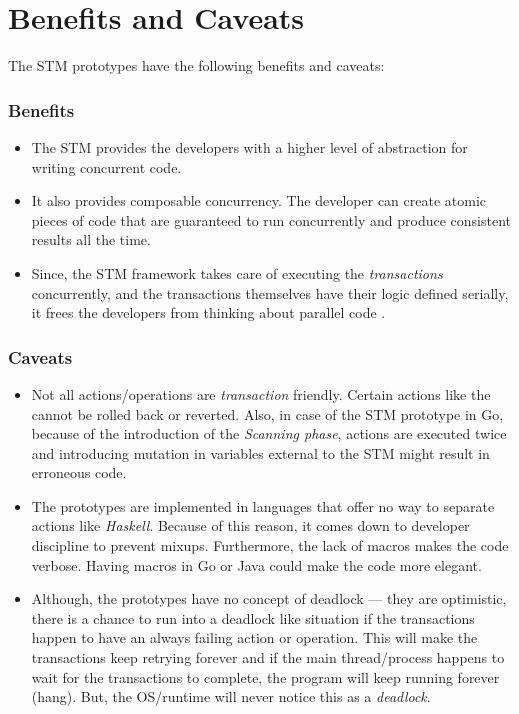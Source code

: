 \documentclass[../main]{subfiles}
\begin{document}
  \section{Benefits and Caveats}

  \par
  The STM prototypes have the following benefits and caveats:

  \subsubsection{Benefits}
  \begin{itemize}
    
    \item The STM provides the developers with a higher level of abstraction for writing concurrent code.

    \item It also provides composable concurrency. The developer can create atomic pieces of code that are guaranteed to run concurrently and produce consistent results all the time.

    \item Since, the STM framework takes care of executing the {\em transactions} concurrently, and the transactions themselves have their logic defined serially, it frees the developers from thinking about parallel code \cite{weimerskirch2008software}.

  \end{itemize}

  \subsubsection{Caveats}
  \begin{itemize}

    \item Not all actions/operations are {\em transaction} friendly. Certain actions like the  cannot be rolled back or reverted. Also, in case of the STM prototype in Go, because of the introduction of the {\em Scanning phase}, actions are executed twice and introducing mutation in variables external to the STM might result in erroneous code.

    \item The prototypes are implemented in languages that offer no way to separate  actions like {\em Haskell}. Because of this reason, it comes down to developer discipline to prevent mixups. Furthermore, the lack of macros makes the code verbose. Having macros in Go or Java could make the code more elegant.

    \item Although, the prototypes have no concept of deadlock --- they are optimistic, there is a chance to run into a deadlock like situation if the transactions happen to have an always failing action or operation. This will make the transactions keep retrying forever and if the main thread/process happens to wait for the transactions to complete, the program will keep running forever (hang). But, the OS/runtime will never notice this as a {\em deadlock}.

  \end{itemize}
\end{document}
